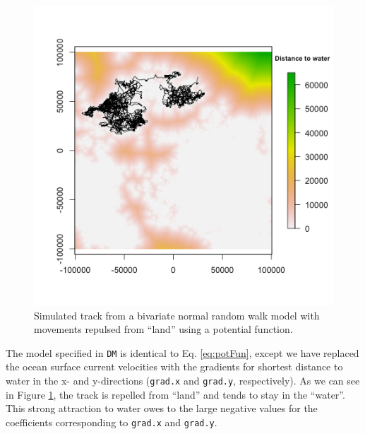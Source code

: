 \documentclass[12pt]{article}\usepackage[]{graphicx}\usepackage[]{color}
\begin{document}
\begin{figure}[htbp]
  \centering
  \includegraphics[width=\textwidth]{plot_landConstraintExample.png}
  \caption{Simulated track from a bivariate normal random walk model with movements repulsed from ``land'' using a potential function.}
  \label{fig:landConstraint}
\end{figure}
The model specified in \verb|DM| is identical to Eq. \ref{eq:potFun}, except we have replaced the ocean surface current velocities with the gradients for shortest distance to water in the x- and y-directions (\verb|grad.x| and \verb|grad.y|, respectively). As we can see in Figure \ref{fig:landConstraint}, the track is repelled from ``land'' and tends to stay in the ``water''. This strong attraction to water owes to the large negative values for the coefficients corresponding to \verb|grad.x| and \verb|grad.y|. 
\end{document}
